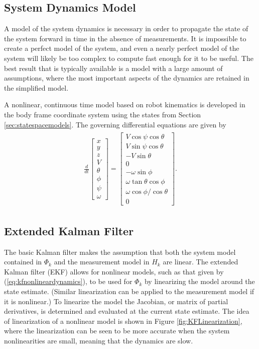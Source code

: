 \subsection{System Dynamics Model}
\label{sec:dynamics}
A model of the system dynamics is necessary in order to propagate the state of the system forward in time in the absence of measurements. It is impossible to create a perfect model of the system, and even a nearly perfect model of the system will likely be too complex to compute fast enough for it to be useful. The best result that is typically available is a model with a large amount of assumptions, where the most important aspects of the dynamics are retained in the simplified model.

A nonlinear, continuous time model based on robot kinematics is developed in the body frame coordinate system using the states from Section \ref{sec:statespacemodels}. The governing differential equations are given by
\begin{align}
\label{eq:kfnonlineardynamics}
\begin{split}
\frac{d}{dt}\left[\begin{array}{c}
x \\ y \\ z \\ V \\ \theta \\ \phi \\ \psi \\ \omega
\end{array}\right] =
\left[\begin{array}{c}
V\cos\psi\cos\theta \\
V\sin\psi\cos\theta \\
-V\sin\theta \\
0 \\
-\omega\sin\phi \\
\omega\tan\theta\cos\phi \\
\omega\cos\phi/\cos\theta \\
0
\end{array}\right].
\end{split}
\end{align}

\subsection{Extended Kalman Filter}
\label{sec:extendedkf}
The basic Kalman filter makes the assumption that both the system model contained in $\Phi_k$ and the measurement model in $H_k$ are linear. The extended Kalman filter (EKF) allows for nonlinear models, such as that given by (\ref{eq:kfnonlineardynamics}), to be used for $\Phi_k$ by linearizing the model around the state estimate. (Similar linearization can be applied to the measurement model if it is nonlinear.) To linearize the model the Jacobian, or matrix of partial derivatives, is determined and evaluated at the current state estimate. The idea of linearization of a nonlinear model is shown in Figure \ref{fig:KFLinearization}, where the linearization can be seen to be more accurate when the system nonlinearities are small, meaning that the dynamics are slow.

